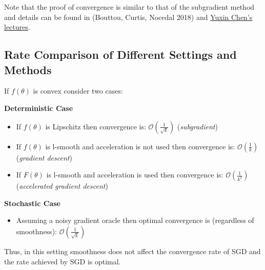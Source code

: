 	


Note that the proof of convergence is similar to that of the subgradient method and details can be found in (Bouttou, Curtis, Nocedal 2018) and \href{http://www.princeton.edu/~yc5/ele522_optimization/lectures/stochastic_gradient.pdf}{Yuxin Chen's lectures}.


\subsection{Rate Comparison of Different Settings and Methods}
If $f(\theta)$ is convex consider two cases:

\noindent \textbf{Deterministic Case}
\begin{itemize}
	\item If $f(\theta)$ is Lipschitz then convergence is: $\mathcal{O}\left(\frac{1}{\sqrt{k}}\right)$ (\textit{subgradient})
	\item If $f(\theta)$ is l-smooth and acceleration is not used then convergence is: $\mathcal{O}\left(\frac{1}{k}\right)$ (\textit{gradient descent})
	\item If $F(\theta)$ is l-smooth and acceleration is used then convergence is: $\mathcal{O}\left(\frac{1}{k^2}\right)$ (\textit{accelerated gradient descent})
\end{itemize}

\noindent \textbf{Stochastic Case}
\begin{itemize}
	\item Assuming a noisy gradient oracle then optimal convergence is (regardless of smoothness): $ \mathcal{O}\left(\frac{1}{\sqrt{k}}\right)$
\end{itemize}

Thus, in this setting smoothness does not affect the convergence rate of SGD and the rate achieved by SGD is optimal. 